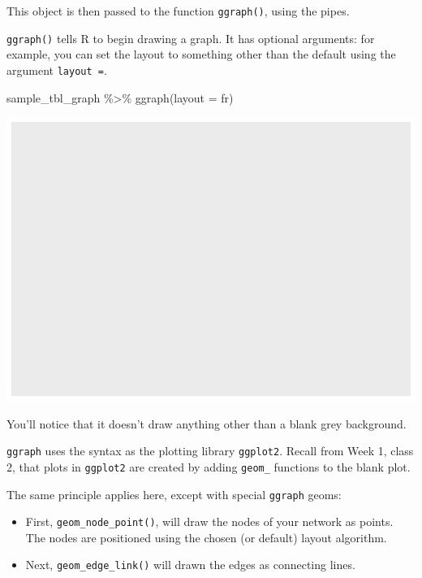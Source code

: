 \documentclass[
]{book}
\newenvironment{Shaded}{\begin{snugshade}}{\end{snugshade}}
\newcommand{\AttributeTok}[1]{\textcolor[rgb]{0.77,0.63,0.00}{#1}}
\newcommand{\FunctionTok}[1]{\textcolor[rgb]{0.00,0.00,0.00}{#1}}
\newcommand{\NormalTok}[1]{#1}
\newcommand{\SpecialCharTok}[1]{\textcolor[rgb]{0.00,0.00,0.00}{#1}}
\newcommand{\StringTok}[1]{\textcolor[rgb]{0.31,0.60,0.02}{#1}}
\begin{document}
This object is then passed to the function \texttt{ggraph()}, using the pipes.

\texttt{ggraph()} tells R to begin drawing a graph. It has optional arguments: for example, you can set the layout to something other than the default using the argument \texttt{layout\ =}.

\begin{Shaded}
\begin{Highlighting}[]
\NormalTok{sample\_tbl\_graph }\SpecialCharTok{\%\textgreater{}\%} \FunctionTok{ggraph}\NormalTok{(}\AttributeTok{layout =} \StringTok{\textquotesingle{}fr\textquotesingle{}}\NormalTok{)}
\end{Highlighting}
\end{Shaded}

\includegraphics{_main_files/figure-latex/unnamed-chunk-57-1.pdf}

You'll notice that it doesn't draw anything other than a blank grey background.

\texttt{ggraph} uses the syntax as the plotting library \texttt{ggplot2}. Recall from Week 1, class 2, that plots in \texttt{ggplot2} are created by adding \texttt{geom\_} functions to the blank plot.

The same principle applies here, except with special \texttt{ggraph} geoms:

\begin{itemize}
\item
  First, \texttt{geom\_node\_point()}, will draw the nodes of your network as points. The nodes are positioned using the chosen (or default) layout algorithm.
\item
  Next, \texttt{geom\_edge\_link()} will drawn the edges as connecting lines.
\end{itemize}
\end{document}
